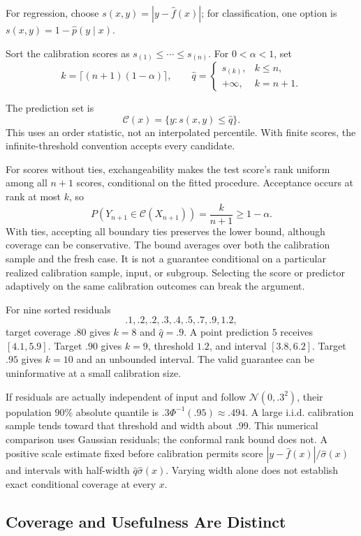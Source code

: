 For regression, choose $s(x,y)=|y-\hat f(x)|$; for classification, one option is $s(x,y)=1-\hat p(y\mid x)$. \par\noindent\begin{minipage}{\linewidth}
Sort the calibration scores as $s_{(1)}\le\cdots\le s_{(n)}$. For $0<\alpha<1$, set
\[
k=\lceil(n+1)(1-\alpha)\rceil,\qquad
\hat q=\begin{cases}s_{(k)},&k\le n,\\+\infty,&k=n+1.\end{cases}
\]
\end{minipage}\par\addvspace{\belowdisplayskip}
The prediction set is
\[
\mathcal C(x)=\{y:s(x,y)\le\hat q\}.
\]
This uses an order statistic, not an interpolated percentile. With finite scores, the infinite-threshold convention accepts every candidate.

For scores without ties, exchangeability makes the test score's rank uniform among all $n+1$ scores, conditional on the fitted procedure. Acceptance occurs at rank at most $k$, so
\[
P(Y_{n+1}\in\mathcal C(X_{n+1}))
=\frac{k}{n+1}\ge1-\alpha.
\]
With ties, accepting all boundary ties preserves the lower bound, although coverage can be conservative. The bound averages over both the calibration sample and the fresh case. It is not a guarantee conditional on a particular realized calibration sample, input, or subgroup. Selecting the score or predictor adaptively on the same calibration outcomes can break the argument.

For nine sorted residuals
\[
.1,.2,.2,.3,.4,.5,.7,.9,1.2,
\]
target coverage $.80$ gives $k=8$ and $\hat q=.9$. A point prediction $5$ receives $[4.1,5.9]$. Target $.90$ gives $k=9$, threshold $1.2$, and interval $[3.8,6.2]$. Target $.95$ gives $k=10$ and an unbounded interval. The valid guarantee can be uninformative at a small calibration size.

If residuals are actually independent of input and follow $\mathcal N(0,.3^2)$, their population $90\%$ absolute quantile is $.3\Phi^{-1}(.95)\approx.494$. A large i.i.d. calibration sample tends toward that threshold and width about $.99$. This numerical comparison uses Gaussian residuals; the conformal rank bound does not. A positive scale estimate fixed before calibration permits score $|y-\hat f(x)|/\hat\sigma(x)$ and intervals with half-width $\hat q\hat\sigma(x)$. Varying width alone does not establish exact conditional coverage at every $x$.

\subsection{Coverage and Usefulness Are Distinct}

